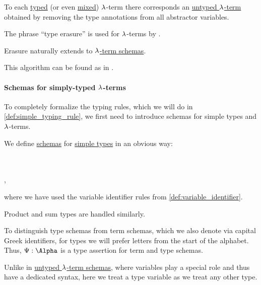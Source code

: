 \begin{algorithm}\label{alg:type_erasure}
  To each \hyperref[def:typed_lambda_term]{typed} (or even \hyperref[rem:mixed_lambda_term]{mixed}) \( {\mathrm \lambda} \)-term there corresponds an \hyperref[def:lambda_term]{untyped \( {\mathrm \lambda} \)-term} obtained by removing the type annotations from all abstractor variables.
\end{algorithm}
\begin{comments}
  \item The phrase \enquote{type erasure} is used for \( {\mathrm \lambda} \)-terms by .
  \item Erasure naturally extends to \hyperref[def:simple_type_schema]{\( {\mathrm \lambda} \)-term schemas}.
  \item This algorithm can be found as  in \cite{notebook:code}.
\end{comments}

\paragraph{Schemas for simply-typed \( {\mathrm \lambda} \)-terms}

To completely formalize the typing rules, which we will do in \cref{def:simple_typing_rule}, we first need to introduce schemas for simple types and \( {\mathrm \lambda} \)-terms.

\begin{definition}\label{def:simple_type_schema}
  We define \hyperref[con:schemas_and_instances]{schemas} for \hyperref[def:simple_type]{simple types} in an obvious way:
  \begin{bnf*}
        {} \\
       {\bnftsq{(} \bnfsp {} \bnfsp \bnftsq{\( \synimplies \)} \bnfsp {} \bnfsp \bnftsq{)}} \\
             { \bnfor {} \bnfor {}},
  \end{bnf*}
  where we have used the variable identifier rules from \cref{def:variable_identifier}.

  Product and sum types are handled similarly.
\end{definition}
\begin{comments}
  \item To distinguish type schemas from term schemas, which we also denote via capital Greek identifiers, for types we will prefer letters from the start of the alphabet. Thus, \( \Psi: \Alpha \) is a type assertion for term and type schemas.

  \item Unlike in \hyperref[def:lambda_term_schema]{untyped \( {\mathrm \lambda} \)-term schemas}, where variables play a special role and thus have a dedicated syntax, here we treat a type variable as we treat any other type.
\end{comments}


